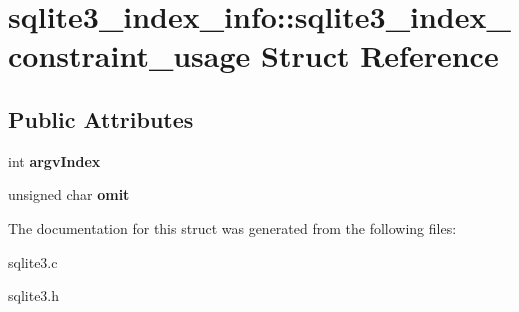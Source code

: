 \hypertarget{structsqlite3__index__info_1_1sqlite3__index__constraint__usage}{\section{sqlite3\-\_\-index\-\_\-info\-:\-:sqlite3\-\_\-index\-\_\-constraint\-\_\-usage Struct Reference}
\label{structsqlite3__index__info_1_1sqlite3__index__constraint__usage}
}
\subsection*{Public Attributes}
\begin{DoxyCompactItemize}
\item 
\hypertarget{structsqlite3__index__info_1_1sqlite3__index__constraint__usage_a2cbf680033c2937b3de226e091743a94}{int {\bfseries argv\-Index}}\label{structsqlite3__index__info_1_1sqlite3__index__constraint__usage_a2cbf680033c2937b3de226e091743a94}

\item 
\hypertarget{structsqlite3__index__info_1_1sqlite3__index__constraint__usage_ad07fa17d30e4fb3abe23ceaf84edf0ef}{unsigned char {\bfseries omit}}\label{structsqlite3__index__info_1_1sqlite3__index__constraint__usage_ad07fa17d30e4fb3abe23ceaf84edf0ef}

\end{DoxyCompactItemize}


The documentation for this struct was generated from the following files\-:\begin{DoxyCompactItemize}
\item 
sqlite3.\-c\item 
sqlite3.\-h\end{DoxyCompactItemize}
